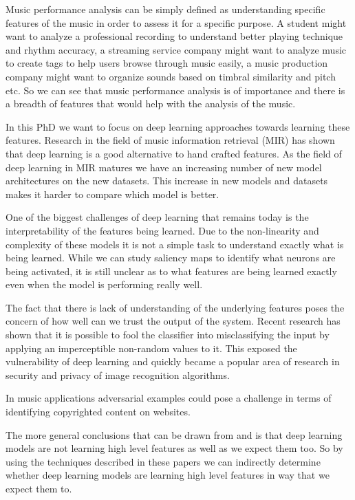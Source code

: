 \documentclass[journal,onecolumn]{IEEEtran}
\begin{document}
Music performance analysis can be simply defined as understanding specific features of the music in order to assess it for a specific purpose. A student might want to analyze a professional recording to understand better playing technique and  rhythm accuracy, a streaming service company might want to analyze music to create tags to help users browse through music easily, a music production company might want to organize sounds based on timbral similarity and pitch etc. So we can see that music performance analysis is of importance and there is a breadth of features that would help with the analysis of the music.

In this PhD we want to focus on deep learning approaches towards learning these features. Research in the field of music information retrieval (MIR) has shown that deep learning is a good alternative to hand crafted features. As the field of deep learning in MIR matures we have an increasing number of new model architectures on the new datasets. This increase in new models and datasets makes it harder to compare which model is better.  

One of the biggest challenges of deep learning that remains today is the interpretability of the features being learned. Due to the non-linearity and complexity of these models it is not a simple task to understand exactly what is being learned. While we can study saliency maps to identify what neurons are being activated, it is still unclear as to what features are being learned exactly even when the model is performing really well.

The fact that there is lack of understanding of the underlying features poses the concern of how well can we trust the output of the system. Recent research \cite{szegedy_intriguing_2013} \cite{goodfellow_explaining_2014} has shown that it is possible to fool the classifier into misclassifying the input by applying an imperceptible non-random values to it. This exposed the vulnerability of deep learning and quickly became a popular area of research in security and privacy of image recognition algorithms. 

In music applications adversarial examples could pose a challenge in terms of identifying copyrighted content on websites. 

The more general conclusions that can be drawn from \cite{szegedy_intriguing_2013} and \cite{goodfellow_explaining_2014} is that deep learning models are not learning high level features as well as we expect them too. So by using the techniques described in these papers we can indirectly determine whether deep learning models are learning high level features in way that we expect them to. 
\end{document}
